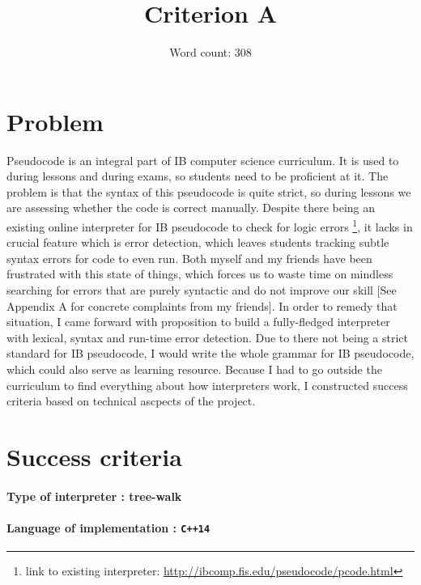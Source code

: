 \documentclass{article}
\title{Criterion A}
\author{Word count: 308}
\date{}
\begin{document}
\maketitle

\section{Problem}

    Pseudocode is an integral part of IB computer science curriculum. It is used
    to during lessons and during exams, so students need to be proficient at it.
    The problem is that the syntax of this pseudocode is quite strict, so during
    lessons we are assessing whether the code is correct manually. Despite there
    being an existing online interpreter for IB pseudocode to check for logic errors
    \footnote{link to existing interpreter: \url{http://ibcomp.fis.edu/pseudocode/pcode.html}}, it lacks in crucial
    feature which is error detection, which leaves students tracking subtle syntax
    errors for code to even run. Both myself and my friends have been frustrated 
    with this state of things, which forces us to waste time on mindless searching
    for errors that are purely syntactic and do not improve our skill [See 
    Appendix A for concrete complaints from my friends]. In order
    to remedy that situation, I came forward with proposition to build a 
    fully-fledged interpreter with lexical, syntax and run-time error detection.
    Due to there not being a strict standard for IB pseudocode, I would write
    the whole grammar for IB pseudocode, which could also serve as learning
    resource. Because I had to go outside the curriculum to find everything about
    how interpreters work, I constructed success criteria based on technical ascpects
    of the project.


\section{Success criteria}

\paragraph{Type of interpreter : tree-walk}
\paragraph{Language of implementation : \texttt{C++14}}
\end{document}
